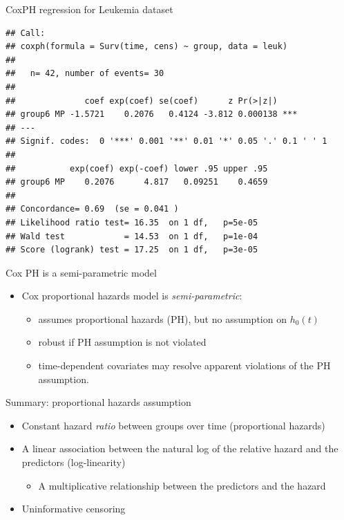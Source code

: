 \documentclass[
  ignorenonframetext,
]{beamer}
\providecommand{\tightlist}{%
  \setlength{\itemsep}{0pt}\setlength{\parskip}{0pt}}
\begin{document}
\begin{frame}[fragile]{CoxPH regression for Leukemia dataset}
\protect\hypertarget{coxph-regression-for-leukemia-dataset}{}

\tiny

\begin{verbatim}
## Call:
## coxph(formula = Surv(time, cens) ~ group, data = leuk)
## 
##   n= 42, number of events= 30 
## 
##              coef exp(coef) se(coef)      z Pr(>|z|)    
## group6 MP -1.5721    0.2076   0.4124 -3.812 0.000138 ***
## ---
## Signif. codes:  0 '***' 0.001 '**' 0.01 '*' 0.05 '.' 0.1 ' ' 1
## 
##           exp(coef) exp(-coef) lower .95 upper .95
## group6 MP    0.2076      4.817   0.09251    0.4659
## 
## Concordance= 0.69  (se = 0.041 )
## Likelihood ratio test= 16.35  on 1 df,   p=5e-05
## Wald test            = 14.53  on 1 df,   p=1e-04
## Score (logrank) test = 17.25  on 1 df,   p=3e-05
\end{verbatim}

\end{frame}

\begin{frame}{Cox PH is a semi-parametric model}
\protect\hypertarget{cox-ph-is-a-semi-parametric-model}{}

\begin{itemize}
\tightlist
\item
  Cox proportional hazards model is \emph{semi-parametric}:

  \begin{itemize}
  \tightlist
  \item
    assumes proportional hazards (PH), but no assumption on \(h_0(t)\)
  \item
    robust if PH assumption is not violated
  \item
    time-dependent covariates may resolve apparent violations of the PH
    assumption.
  \end{itemize}
\end{itemize}

\end{frame}

\begin{frame}{Summary: proportional hazards assumption}
\protect\hypertarget{summary-proportional-hazards-assumption}{}

\begin{itemize}
\tightlist
\item
  Constant hazard \emph{ratio} between groups over time (proportional
  hazards)
\item
  A linear association between the natural log of the relative hazard
  and the predictors (log-linearity)

  \begin{itemize}
  \tightlist
  \item
    A multiplicative relationship between the predictors and the hazard
  \end{itemize}
\item
  Uninformative censoring
\end{itemize}

\end{frame}
\end{document}
